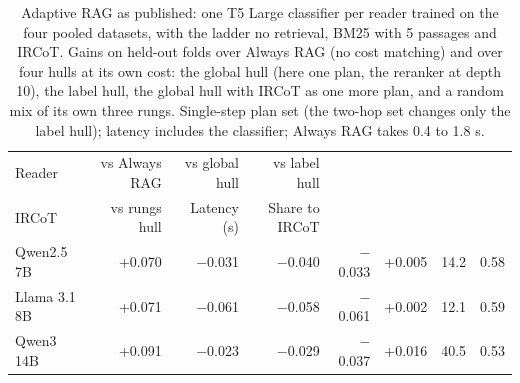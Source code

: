\begin{table}[t]
\centering\small
\setlength{\tabcolsep}{4pt}
\caption{Adaptive RAG as published: one T5 Large classifier per reader trained on the four pooled datasets, with the ladder no retrieval, BM25 with 5 passages and IRCoT. Gains on held-out folds over Always RAG (no cost matching) and over four hulls at its own cost: the global hull (here one plan, the reranker at depth 10), the label hull, the global hull with IRCoT as one more plan, and a random mix of its own three rungs. Single-step plan set (the two-hop set changes only the label hull); latency includes the classifier; Always RAG takes 0.4 to 1.8 s.}
\label{tab:arpub}
\begin{tabular*}{\linewidth}{@{\extracolsep{\fill}}lrrrrrrr}
\toprule
Reader & vs Always RAG & vs global hull & vs label hull & \begin{tabular}[b]{@{}r@{}}vs hull with \\ IRCoT\end{tabular} & vs rungs hull & Latency (s) & Share to IRCoT \\
\midrule
Qwen2.5 7B & +0.070 & $-$0.031 & $-$0.040 & $-$0.033 & +0.005 & 14.2 & 0.58 \\
Llama 3.1 8B & +0.071 & $-$0.061 & $-$0.058 & $-$0.061 & +0.002 & 12.1 & 0.59 \\
Qwen3 14B & +0.091 & $-$0.023 & $-$0.029 & $-$0.037 & +0.016 & 40.5 & 0.53 \\
\bottomrule
\end{tabular*}
\end{table}
